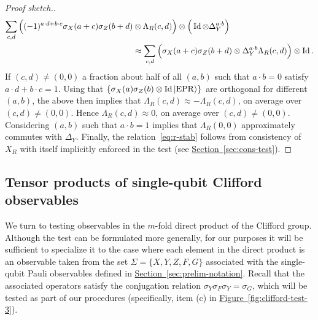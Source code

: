 \documentclass[11pt]{article}
\numberwithin{equation}{section}
\theoremstyle{definition}
\theoremstyle{plain}
\newcommand{\expref}[2]{\hyperref[#2]{#1~\ref{#2}}}
\newcommand{\ket}[1]{|#1\rangle}
\newcommand{\Id}{\ensuremath{\mathop{\rm Id}\nolimits}}
\newcommand{\EPR}{{\rm EPR}}
\newcommand{\phase}{\Lambda}
\begin{document}
\begin{proof}[Proof sketch.]
\begin{align*}
\sum_{c,d} \Big((-1)^{a\cdot d  +b\cdot c}\sigma_X(a+c)\sigma_Z(b+d) &\otimes \phase_R(c,d)\Big) \otimes \Big(\Id \otimes \Delta_Y^{a\cdot b}\Big)\\
& \approx \sum_{c,d} \Big( \sigma_X(a+c)\sigma_Z(b+d) \otimes \Delta_Y^{a\cdot b } \phase_R(c,d)\Big) \otimes \Id .
\end{align*}
If $(c,d)\neq (0,0)$ a fraction about half of all $(a,b)$ such that $a\cdot b = 0$ satisfy $a\cdot d + b\cdot c = 1$. Using that $\{\sigma_X(a)\sigma_Z(b) \otimes \Id \ket{\EPR}\}$ are orthogonal for different $(a,b)$, the above then implies that $\phase_R(c,d)\approx -\phase_R(c,d)$, on average over $(c,d)\neq (0,0)$. Hence $\phase_R(c,d)\approx 0$, on average over $(c,d)\neq (0,0)$. 
Considering $(a,b)$ such that $a\cdot b=1$ implies that $\phase_R(0,0)$ approximately commutes with $\Delta_Y$. Finally, the relation~\eqref{eq:r-stab} follows from consistency of $X_R$ with itself implicitly enforced in the test (see \expref{Section}{sec:cons-test}).
\end{proof}

\subsection{Tensor products of single-qubit Clifford observables}
\label{sec:n-2-clifford}

We turn to testing observables in the $m$-fold direct product of the Clifford group. Although the test can be formulated more generally, for our purposes it will be sufficient to specialize it to the case where each element in the direct product is an observable taken from the set  $\Sigma = \{X,Y,Z,F,G\}$ associated with the single-qubit Pauli observables defined in \expref{Section}{sec:prelim-notation}. Recall that the associated operators satisfy the conjugation relation $\sigma_Y \sigma_F \sigma_Y = \sigma_G$, which will be tested as part of our procedures (specifically, item (c) in \expref{Figure}{fig:clifford-test-3}).
\end{document}
